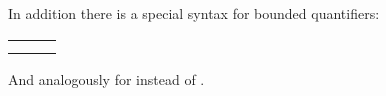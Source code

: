\begin{isabellebody}
\begin{isamarkuptext}
In addition there is a special syntax for bounded quantifiers:
\begin{center}
\begin{tabular}{lcl}
\isa{{\isasymforall}x{\isasymle}y{\isachardot}\ P\ x} & \isa{{\isasymrightleftharpoons}} & \isa{{\isacharbraceleft}{\isacharbackslash}isachardoublequote{\isacharbraceright}{\isasymforall}x{\isachardot}\ x\ {\isasymle}\ y\ {\isasymlongrightarrow}\ P\ x{\isacharbraceleft}{\isacharbackslash}isachardoublequote{\isacharbraceright}} \\
\isa{{\isasymexists}x{\isasymle}y{\isachardot}\ P\ x} & \isa{{\isasymrightleftharpoons}} & \isa{{\isacharbraceleft}{\isacharbackslash}isachardoublequote{\isacharbraceright}{\isasymexists}x{\isachardot}\ x\ {\isasymle}\ y\ {\isasymand}\ P\ x{\isacharbraceleft}{\isacharbackslash}isachardoublequote{\isacharbraceright}}
\end{tabular}
\end{center}
And analogously for \isa{{\isacharless}} instead of \isa{{\isasymle}}.%
\end{isamarkuptext}%
\isamarkuptrue%
\isamarkupfalse%
\end{isabellebody}%
